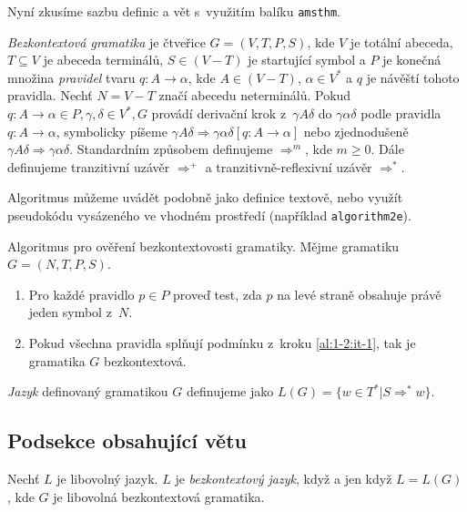 \documentclass[11pt,a4paper,twocolumn]{article}
\begin{document}
Nyní zkusíme sazbu definic a vět s~využitím balíku \texttt{amsthm}.
\begin{dfn}\label{def:d1-1} \emph{Bezkontextová gramatika} je čtveřice $G=(V,T,P,S)$, kde $V$ je totální abeceda, $T\!\subseteq\!V$ je abeceda terminálů, $S\!\in\!(V\!-\!T)$ je startující symbol a $P$ je konečná množina \emph{pravidel} tvaru $q\colon A\to\alpha$, kde $A\!\in\!(V\!-\!T)$, $\alpha \in V^*$ a $q$ je návěští tohoto pravidla. Nechť $N=V\!-\!T$ značí abecedu neterminálů. Pokud $q\colon A\to\alpha\in P,\gamma,\delta\in V^*,G$ provádí derivační krok z~$\gamma A\delta$ do $\gamma\alpha\delta$ podle pravidla $q\colon A\to\alpha$, symbolicky píšeme $\gamma A\delta \Rightarrow \gamma \alpha \delta[q\colon A\to\alpha]$ nebo zjednodušeně $\gamma A\delta\Rightarrow\gamma\alpha\delta$. Standardním způsobem definujeme $\Rightarrow^m$, kde $m\geq 0$. Dále definujeme tranzitivní uzávěr $\Rightarrow^+$ a tranzitivně-reflexivní uzávěr $\Rightarrow^*$.\end{dfn}

Algoritmus můžeme uvádět podobně jako definice textově, nebo využít pseudokódu vysázeného ve vhodném prostředí (například \texttt{algorithm2e}).

\begin{alg} Algoritmus pro ověření bezkontextovosti gramatiky. Mějme gramatiku $G = (N, T, P, S)$.
 \begin{enumerate}
 \item\label{al:1-2:it-1} Pro každé pravidlo $p\in P$ proveď test, zda $p$ na levé straně obsahuje právě jeden symbol z~$N$.
 \item Pokud všechna pravidla splňují podmínku z~kroku \ref{al:1-2:it-1}, tak je gramatika $G$ bezkontextová.
 \end{enumerate}\end{alg}

\begin{dfn} \emph{Jazyk} definovaný gramatikou $G$ definujeme jako $L(G)=\{w\in T^*|S\Rightarrow^*w\}$.\end{dfn}

\subsection{Podsekce obsahující větu}

\begin{dfn} Nechť $L$ je libovolný jazyk. $L$ je \emph{bezkontextový jazyk}, když a jen když $L=L(G)$, kde $G$ je libovolná bezkontextová gramatika.\end{dfn}
\end{document}

